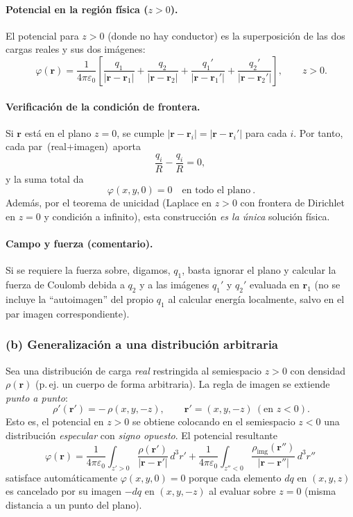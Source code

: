 \documentclass{article}
\begin{document}
\paragraph{Potencial en la región física ($z>0$).}
El potencial para $z>0$ (donde no hay conductor) es la superposición de las dos cargas reales y sus dos imágenes:
\[
\boxed{\ \ 
\varphi(\mathbf r)=\frac{1}{4\pi\varepsilon_0}
\left[\frac{q_{1}}{\lvert \mathbf r-\mathbf r_{1}\rvert}
+\frac{q_{2}}{\lvert \mathbf r-\mathbf r_{2}\rvert}
+\frac{q_{1}'}{\lvert \mathbf r-\mathbf r_{1}'\rvert}
+\frac{q_{2}'}{\lvert \mathbf r-\mathbf r_{2}'\rvert}\right],\qquad z>0.\
}
\]
\paragraph{Verificación de la condición de frontera.}
Si $\mathbf r$ está en el plano $z=0$, se cumple $\lvert \mathbf r-\mathbf r_i\rvert=\lvert \mathbf r-\mathbf r_i'\rvert$ para cada $i$. Por tanto, cada par \,(real+imagen)\, aporta
\[
\frac{q_i}{R}-\frac{q_i}{R}=0,
\]
y la suma total da
\[
\boxed{\ \varphi(x,y,0)=0\quad\text{en todo el plano}\ }.
\]
Además, por el teorema de unicidad (Laplace en $z>0$ con frontera de Dirichlet en $z=0$ y condición a infinito), esta construcción \emph{es la única} solución física.

\paragraph{Campo y fuerza (comentario).} Si se requiere la fuerza sobre, digamos, $q_1$, basta ignorar el plano y calcular la fuerza de Coulomb debida a $q_2$ y a las imágenes $q_1'$ y $q_2'$ evaluada en $\mathbf r_1$ (no se incluye la “autoimagen” del propio $q_1$ al calcular energía localmente, salvo en el par imagen correspondiente).

\subsubsection*{(b) Generalización a una distribución arbitraria}
Sea una distribución de carga \emph{real} restringida al semiespacio $z>0$ con densidad $\rho(\mathbf r)$ (p.\,ej. un cuerpo de forma arbitraria). La regla de imagen se extiende \emph{punto a punto}:
\[
\boxed{\ \ \rho'(\mathbf r')=-\,\rho(x,y,-z),\qquad \mathbf r'=(x,y,-z)\ (\text{en }z<0). \ }
\]
Esto es, el potencial en $z>0$ se obtiene colocando en el semiespacio $z<0$ una distribución \emph{especular} con \emph{signo opuesto}. El potencial resultante
\[
\varphi(\mathbf r)=\frac{1}{4\pi\varepsilon_0}\int_{z'>0}\frac{\rho(\mathbf r')}{\lvert \mathbf r-\mathbf r'\rvert}\,d^3r'
+\frac{1}{4\pi\varepsilon_0}\int_{z''<0}\frac{\rho_{\text{img}}(\mathbf r'')}{\lvert \mathbf r-\mathbf r''\rvert}\,d^3r''
\]
satisface automáticamente $\varphi(x,y,0)=0$ porque cada elemento $dq$ en $(x,y,z)$ es cancelado por su imagen $-dq$ en $(x,y,-z)$ al evaluar sobre $z=0$ (misma distancia a un punto del plano).
\end{document}
